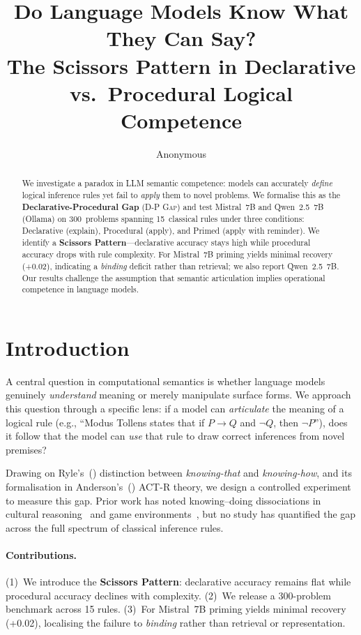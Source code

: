 \documentclass[11pt]{article}
\title{Do Language Models Know What They Can Say?\\
The Scissors Pattern in Declarative vs.\ Procedural Logical Competence}
\author{Anonymous}
\newcommand{\dpgap}{\textsc{D-P Gap}}
\begin{document}
\maketitle

\begin{abstract}
We investigate a paradox in LLM semantic competence: models can
accurately \emph{define} logical inference rules yet fail to
\emph{apply} them to novel problems.
We formalise this as the \textbf{Declarative-Procedural Gap}
(\dpgap{}) and test Mistral~7B and Qwen~2.5~7B (Ollama) on 300~problems spanning
15~classical rules under three conditions: Declarative (explain),
Procedural (apply), and Primed (apply with reminder).
We identify a \textbf{Scissors Pattern}---declarative accuracy
stays high while procedural accuracy drops with rule complexity.
For Mistral~7B priming yields minimal recovery (+0.02), indicating a
\emph{binding} deficit rather than retrieval; we also report Qwen~2.5~7B.
Our results challenge the assumption that semantic articulation
implies operational competence in language models.
\end{abstract}

\section{Introduction}

A central question in computational semantics is whether language
models genuinely \emph{understand} meaning or merely manipulate
surface forms.
We approach this question through a specific lens: if a model can
\emph{articulate} the meaning of a logical rule (e.g., ``Modus
Tollens states that if $P \to Q$ and $\neg Q$, then $\neg P$''),
does it follow that the model can \emph{use} that rule to draw
correct inferences from novel premises?

Drawing on Ryle's~(\citeyear{ryle1949}) distinction between
\emph{knowing-that} and \emph{knowing-how}, and its formalisation
in Anderson's~(\citeyear{anderson1983}) ACT-R theory, we design a
controlled experiment to measure this gap.
Prior work has noted knowing--doing dissociations in cultural
reasoning~\cite{kinshipqa2026} and game
environments~\cite{liao2025tig}, but no study has quantified the
gap across the full spectrum of classical inference rules.

\paragraph{Contributions.}
(1)~We introduce the \textbf{Scissors Pattern}: declarative accuracy
remains flat while procedural accuracy declines with complexity.
(2)~We release a 300-problem benchmark across 15 rules.
(3)~For Mistral~7B priming yields minimal recovery (+0.02), localising
the failure to \emph{binding} rather than retrieval or representation.
\end{document}
